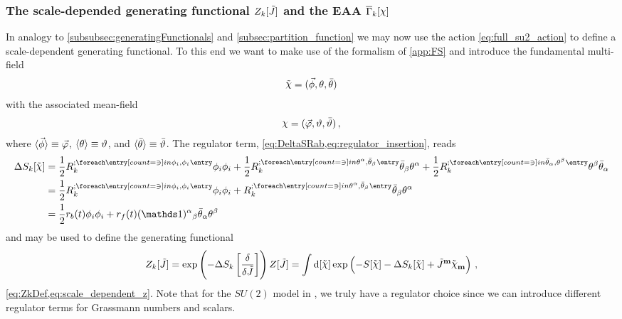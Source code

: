 \subsubsection{The scale-depended generating functional \texorpdfstring{$Z_k[\tilde{J}]$}{} and the EAA \texorpdfstring{$\FSeaa_\FSk[\MFchi]$}{}}\label{subsubsec:0dSU2modelInt}
In analogy to \cref{subsubsec:generatingFunctionals} and \cref{subsec:partition_function} we may now use the action \cref{eq:full_su2_action} to define a scale-dependent generating functional.
To this end we want to make use of the \fs{} formalism of \cref{app:FS} and introduce the fundamental multi-field 
\begin{align}
\Fchi=(\vec{\Fphi},\Ftheta,\Fthetab)\label{eq:0dSU2modelFChi}
\end{align}
with the associated mean-field
\begin{align}
\MFchi=(\vec{\MFphi},\MFtheta,\MFthetab)\,,
\label{eq:0dSU2modelMFChi}
\end{align}
where $\langle\vec{\phi}\rangle\equiv \vec{\varphi}$, $\langle\theta\rangle\equiv\vartheta$, and $\langle\bar{\theta}\rangle\equiv\bar{\vartheta}$.
The \frg{} regulator term, \cf{} \cref{eq:DeltaSRab,eq:regulator_insertion}, reads
\begin{subequations}\label{eq:0dSU2DeltaSk}
\begin{align}
	\Delta S_\FSk[\Fchi]&=%
	\frac{1}{2}\FSregulator{\Fphi_i,\Fphi_i}\Fphi_i\Fphi_i
	+\frac{1}{2}\FSregulator{\Ftheta^\alpha,\Fthetab_\beta}\Fthetab_\beta\Ftheta^\alpha
	+\frac{1}{2}\FSregulator{\Fthetab_\alpha,\Ftheta^\beta}\Ftheta^\beta\Fthetab_\alpha
	\\
	&=\frac{1}{2}\FSregulator{\Fphi_i,\Fphi_i}\Fphi_i\Fphi_i
	+\FSregulator{\Ftheta^\alpha,\Fthetab_\beta}\Fthetab_\beta\Ftheta^\alpha\\
	&=\frac{1}{2}r_{b}(t)\Fphi_i\Fphi_i + r_{f}(t) (\Id)^{\alpha}{}_{\beta} \Fthetab_\alpha\Ftheta^\beta 
\end{align}
\end{subequations}
and may be used to define the \rgscaledependent{} generating functional
\begin{align}
	Z_\FSk[\FSff{J}]=\exp\del{-\Delta S_\FSk\sbr{\frac{\delta}{\delta \FSff{J}}}}Z[\FSff{J}]= \int \dif\,[\FSff{\FSsf}] \exp\del{-S[\FSff{\FSsf}]-\Delta S_{\FSk}[\Fchi]+\FSffu{J}{m}\FSffd{\chi}{m}}\,,
	\label{eq:0dSU2Zk}
\end{align}
\cf{} \cref{eq:ZkDef,eq:scale_dependent_z}.
Note that for the $SU(2)$ model in \dzero{}, we truly have a regulator choice since we can introduce different regulator terms for Grassmann numbers and scalars.
